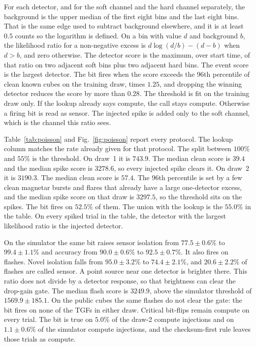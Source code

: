 \documentclass{ieeeaccess}
\begin{document}
For each detector, and for the soft channel and the hard channel separately, the background is the upper median of the first eight bins and the last eight bins. That is the same edge used to subtract background elsewhere, and it is at least $0.5$ counts so the logarithm is defined. On a bin with value $d$ and background $b$, the likelihood ratio for a non-negative excess is $d\log(d/b)-(d-b)$ when $d>b$, and zero otherwise. The detector score is the maximum, over start time, of that ratio on two adjacent soft bins plus two adjacent hard bins. The event score is the largest detector. The bit fires when the score exceeds the 96th percentile of clean known cubes on the training draw, times $1.25$, and dropping the winning detector reduces the score by more than $0.28$. The threshold is fit on the training draw only. If the lookup already says compute, the call stays compute. Otherwise a firing bit is read as sensor. The injected spike is added only to the soft channel, which is the channel this ratio sees.

Table~\ref{tab:poisson} and Fig.~\ref{fig:poisson} report every protocol. The lookup column matches the rate already given for that protocol. The split between $100\%$ and $55\%$ is the threshold. On draw~1 it is $743.9$. The median clean score is $39.4$ and the median spike score is $3278.6$, so every injected spike clears it. On draw~2 it is $3190.3$. The median clean score is $57.4$. The 96th percentile is set by a few clean magnetar bursts and flares that already have a large one-detector excess, and the median spike score on that draw is $3297.5$, so the threshold sits on the spikes. The bit fires on $52.5\%$ of them. The union with the lookup is the $55.0\%$ in the table. On every spiked trial in the table, the detector with the largest likelihood ratio is the injected detector.

On the simulator the same bit raises sensor isolation from $77.5 \pm 0.6\%$ to $99.4 \pm 1.1\%$ and accuracy from $90.0 \pm 0.6\%$ to $92.5 \pm 0.7\%$. It also fires on flashes. Novel isolation falls from $95.0 \pm 3.2\%$ to $74.4 \pm 2.1\%$, and $20.6 \pm 2.2\%$ of flashes are called sensor. A point source near one detector is brighter there. This ratio does not divide by a detector response, so that brightness can clear the drop-gain gate. The median flash score is $3249.9$, above the simulator threshold of $1569.9 \pm 185.1$. On the public cubes the same flashes do not clear the gate: the bit fires on none of the TGFs in either draw. Critical bit-flips remain compute on every trial. The bit is true on $5.0\%$ of the draw-2 compute injections and on $1.1 \pm 0.6\%$ of the simulator compute injections, and the checksum-first rule leaves those trials as compute.
\end{document}
